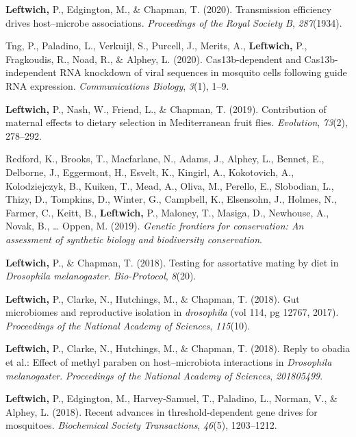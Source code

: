 \documentclass[11pt, a4paper]{awesome-cv}
\begin{document}
\leavevmode\hypertarget{ref-14}{}%
\textbf{Leftwich,} P., Edgington, M., \& Chapman, T. (2020).
Transmission efficiency drives host--microbe associations.
\emph{Proceedings of the Royal Society B}, \emph{287}(1934).

\leavevmode\hypertarget{ref-16}{}%
Tng, P., Paladino, L., Verkuijl, S., Purcell, J., Merits, A.,
\textbf{Leftwich,} P., Fragkoudis, R., Noad, R., \& Alphey, L. (2020).
Cas13b-dependent and {Cas}13b-independent {RNA} knockdown of viral
sequences in mosquito cells following guide {RNA} expression.
\emph{Communications Biology}, \emph{3}(1), 1--9.

\leavevmode\hypertarget{ref-15}{}%
\textbf{Leftwich,} P., Nash, W., Friend, L., \& Chapman, T. (2019).
Contribution of maternal effects to dietary selection in {Mediterranean}
fruit flies. \emph{Evolution}, \emph{73}(2), 278--292.

\leavevmode\hypertarget{ref-6}{}%
Redford, K., Brooks, T., Macfarlane, N., Adams, J., Alphey, L., Bennet,
E., Delborne, J., Eggermont, H., Esvelt, K., Kingirl, A., Kokotovich,
A., Kolodziejczyk, B., Kuiken, T., Mead, A., Oliva, M., Perello, E.,
Slobodian, L., Thizy, D., Tompkins, D., Winter, G., Campbell, K.,
Elsensohn, J., Holmes, N., Farmer, C., Keitt, B., \textbf{Leftwich,} P.,
Maloney, T., Masiga, D., Newhouse, A., Novak, B., \ldots{} Oppen, M.
(2019). \emph{Genetic frontiers for conservation: An assessment of
synthetic biology and biodiversity conservation}.

\leavevmode\hypertarget{ref-17}{}%
\textbf{Leftwich,} P., \& Chapman, T. (2018). Testing for assortative
mating by diet in \emph{{Drosophila} melanogaster}. \emph{Bio-Protocol},
\emph{8}(20).

\leavevmode\hypertarget{ref-3}{}%
\textbf{Leftwich,} P., Clarke, N., Hutchings, M., \& Chapman, T. (2018).
Gut microbiomes and reproductive isolation in \emph{drosophila} (vol
114, pg 12767, 2017). \emph{Proceedings of the National Academy of
Sciences}, \emph{115}(10).

\leavevmode\hypertarget{ref-10}{}%
\textbf{Leftwich,} P., Clarke, N., Hutchings, M., \& Chapman, T. (2018).
Reply to obadia et al.: Effect of methyl paraben on host--microbiota
interactions in \emph{{Drosophila} melanogaster}. \emph{Proceedings of
the National Academy of Sciences}, \emph{201805499}.

\leavevmode\hypertarget{ref-5}{}%
\textbf{Leftwich,} P., Edgington, M., Harvey-Samuel, T., Paladino, L.,
Norman, V., \& Alphey, L. (2018). Recent advances in threshold-dependent
gene drives for mosquitoes. \emph{Biochemical Society Transactions},
\emph{46}(5), 1203--1212.
\end{document}
